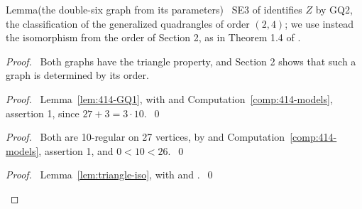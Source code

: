 \begin{namedresult}{Lemma}{(the double-six graph from its parameters)}\label{lem:414-gq24iso}
 \new\ SE3 of  identifies $Z$ by GQ2, the classification of the
 generalized quadrangles of order $(2,4)$; we use instead the isomorphism from the order of
 Section 2, as in Theorem 1.4 of .
\end{namedresult}
\begin{proof}
 \pfsketch\ Both graphs have the triangle property, and Section 2 shows that such a graph is
 determined by its order.
 \begin{proof}\pf\ Lemma~\ref{lem:414-GQ1}, with  and Computation~\ref{comp:414-models},
  assertion 1, since $27+3=3\cdot10$.~\qed\end{proof}
 \begin{proof}\pf\ Both are 10-regular on 27 vertices, by  and
  Computation~\ref{comp:414-models}, assertion 1, and $0<10<26$.~\qed\end{proof}
 \qedstep
 \begin{proof}\pf\ Lemma~\ref{lem:triangle-iso}, with  and
  .~\qed\end{proof}
\end{proof}

